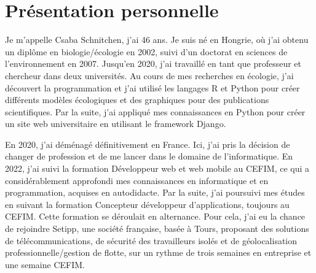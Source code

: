 \section{Présentation personnelle}\label{sec:presentation-personnelle}


Je m'appelle Csaba Schnitchen, j'ai 46 ans. Je suis né en Hongrie, où j'ai obtenu un diplôme en biologie/écologie en 2002, suivi d'un doctorat en sciences de l'environnement en 2007. Jusqu'en 2020, j'ai travaillé en tant que professeur et chercheur dans deux universités. Au cours de mes recherches en écologie, j'ai découvert la programmation et j'ai utilisé les langages R et Python pour créer différents modèles écologiques et des graphiques pour des publications scientifiques. Par la suite, j'ai appliqué mes connaissances en Python pour créer un site web universitaire en utilisant le framework Django.

En 2020, j'ai déménagé définitivement en France. Ici, j'ai pris la décision de changer de profession et de me lancer dans le domaine de l'informatique. En 2022, j'ai suivi la formation Développeur web et web mobile au CEFIM, ce qui a considérablement approfondi mes connaissances en informatique et en programmation, acquises en autodidacte. Par la suite, j'ai poursuivi mes études en suivant la formation Concepteur développeur d'applications, toujours au CEFIM. Cette formation se déroulait en alternance. Pour cela, j'ai eu la chance de rejoindre Setipp, une société française, basée à Tours, proposant des solutions de télécommunications, de sécurité des travailleurs isolés et de géolocalisation professionnelle/gestion de flotte, sur un rythme de trois semaines en entreprise et une semaine CEFIM.